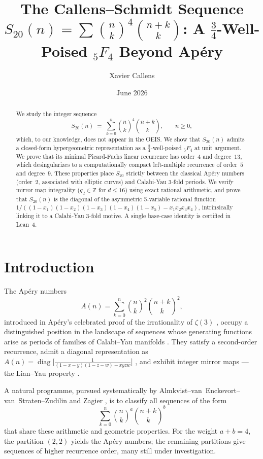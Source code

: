 \documentclass[12pt,reqno]{amsart}
\title[The Callens--Schmidt Sequence]{The Callens--Schmidt Sequence $S_{20}(n) = \sum \binom{n}{k}^4 \binom{n+k}{k}$:
A $\frac{3}{4}$-Well-Poised ${}_5F_4$ Beyond Ap\'ery}
\author{Xavier Callens}
\date{June 2026}
\theoremstyle{plain}
\theoremstyle{definition}
\theoremstyle{remark}
\newcommand{\ZZ}{\mathbb{Z}}
\newcommand{\pFq}[2]{{}_{#1}F_{#2}}
\DeclareMathOperator{\diag}{diag}
\begin{document}
\begin{abstract}
We study the integer sequence
\[
S_{20}(n) \;=\; \sum_{k=0}^{n} \binom{n}{k}^{\!4}\binom{n+k}{k},
\qquad n \ge 0,
\]
which, to our knowledge, does not appear in the OEIS.
We show that $S_{20}(n)$ admits a closed-form
hypergeometric representation as a $\tfrac{3}{4}$-well-poised
$\pFq{5}{4}$ at unit argument. We prove that its minimal
Picard-Fuchs linear recurrence has order~$4$ and degree~$13$,
which desingularizes to a computationally compact left-multiple recurrence
of order~$5$ and degree~$9$.
These properties place $S_{20}$ strictly between the classical
Ap\'ery numbers (order~$2$, associated with elliptic curves) and
Calabi-Yau 3-fold periods. We verify mirror map integrality
($q_d \in \ZZ$ for $d \le 16$) using exact rational arithmetic, and prove that
$S_{20}(n)$ is the diagonal of the asymmetric 5-variable rational function
$1 / ((1-x_1)(1-x_2)(1-x_3)(1-x_4)(1-x_5) - x_1 x_2 x_3 x_4)$,
intrinsically linking it to a Calabi-Yau 3-fold motive.
A single base-case identity is certified in Lean~4.
\end{abstract}

\maketitle

\section{Introduction}\label{sec:intro}

The Ap\'ery numbers
\[
A(n) = \sum_{k=0}^{n} \binom{n}{k}^2 \binom{n+k}{k}^2,
\]
introduced in Ap\'ery's celebrated proof of the irrationality
of $\zeta(3)$ \cite{Apery1979,vanderPoorten1979}, occupy a
distinguished position in the landscape of sequences
whose generating functions arise as periods of families of
Calabi--Yau manifolds \cite{AESZ,Zagier2009}.
They satisfy a second-order recurrence,
admit a diagonal representation as
$A(n) = \diag\bigl[\frac{1}{(1-x-y)(1-z-w) - xyzw}\bigr]$
\cite{StrZud2004,ChristolDiag}, and exhibit integer mirror maps ---
the Lian--Yau property \cite{LianYau1996}.

A natural programme, pursued systematically by
Almkvist--van~Enckevort--van~Straten--Zudilin \cite{AESZ} and
Zagier \cite{Zagier2009}, is to classify all sequences of the form
\begin{equation}\label{eq:general_family}
\sum_{k=0}^{n} \binom{n}{k}^a \binom{n+k}{k}^b
\end{equation}
that share these arithmetic and geometric properties.
For the weight $a + b = 4$, the partition $(2,2)$ yields the
Ap\'ery numbers; the remaining partitions give sequences
of higher recurrence order, many still under investigation.
\end{document}
